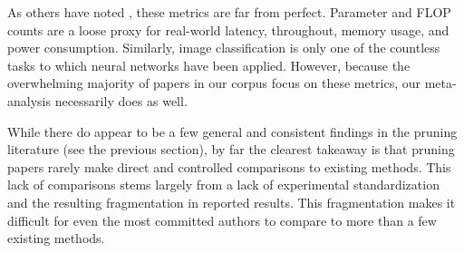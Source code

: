 As others have noted \cite{lempitsky-cp-decomp, perforated-cnns, bayesian-compression, sze-energy-aware, learning-both, samsung-vbmf-tucker, ssl, thinet-channel-norms, amc-automl-han}, these metrics are far from perfect. Parameter and FLOP counts are a loose proxy for real-world latency, throughout, memory usage, and power consumption. %
Similarly, image classification is only one of the countless tasks to which neural networks have been applied. However, because the overwhelming majority of papers in our corpus focus on these metrics, our meta-analysis necessarily does as well.





While there do appear to be a few general and consistent findings in the pruning literature (see the previous section), by far the clearest takeaway is that pruning papers rarely make direct and controlled comparisons to existing methods. This lack of comparisons stems largely from a lack of experimental standardization and the resulting fragmentation in reported results. This fragmentation makes it difficult for even the most committed authors to compare to more than a few existing methods.

